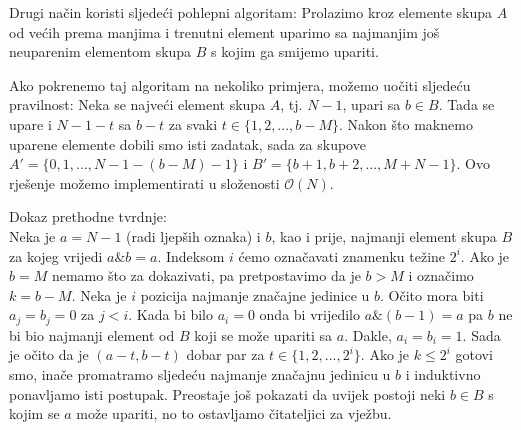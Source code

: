 \documentclass[a4paper]{article}
\begin{document}
Drugi način koristi sljedeći pohlepni algoritam: Prolazimo kroz elemente skupa
$A$ od većih prema manjima i trenutni element uparimo sa najmanjim još
neuparenim elementom skupa $B$ s kojim ga smijemo upariti.

Ako pokrenemo taj algoritam na nekoliko primjera, možemo uočiti sljedeću
pravilnost: Neka se najveći element skupa $A$, tj. $N - 1$, upari sa $b \in B$.
Tada se upare i $N - 1 - t$ sa $b - t$ za svaki $t \in \{1, 2, ..., b - M\}$.
Nakon što maknemo uparene elemente dobili smo isti zadatak, sada za skupove
$A' = \{0, 1, ..., N - 1 - (b - M) - 1\}$ i
$B' = \{b + 1, b + 2, ..., M + N - 1\}$. Ovo rješenje možemo implementirati u
složenosti $\mathcal{O}(N)$.

Dokaz prethodne tvrdnje:\\
Neka je $a = N - 1$ (radi ljepših oznaka) i $b$, kao i prije, najmanji element
skupa $B$ za kojeg vrijedi $a \mathbin\& b = a$. Indeksom $i$ ćemo označavati znamenku
težine $2^i$. Ako je $b = M$ nemamo što za dokazivati, pa pretpostavimo da je
$b > M$ i označimo $k = b - M$. Neka je $i$ pozicija najmanje značajne jedinice u $b$.
Očito mora biti $a_j = b_j = 0$ za $j < i$. Kada bi bilo $a_i = 0$ onda bi vrijedilo
$a \mathbin\& (b - 1) = a$ pa $b$ ne bi bio najmanji element od $B$ koji se može upariti
sa $a$. Dakle, $a_i = b_i = 1$. Sada je očito da je $(a - t, b - t)$ dobar par za
$t \in \{1, 2, ..., 2^i\}$. Ako je $k \leq 2^i$ gotovi smo, inače promatramo sljedeću
najmanje značajnu jedinicu u $b$ i induktivno ponavljamo isti postupak.
Preostaje još pokazati da uvijek postoji neki $b \in B$ s kojim se $a$ može upariti, no
to ostavljamo čitateljici za vježbu.
\end{document}
